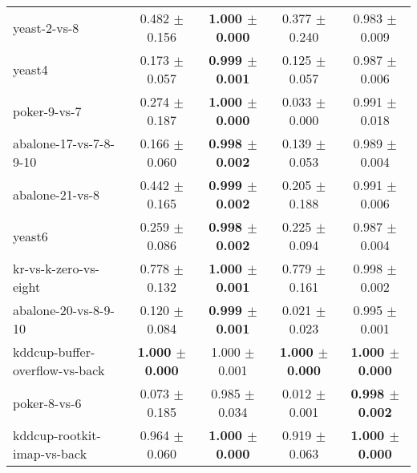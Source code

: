 \begin{table}[!ht]
{\begin{tabular}{l c c c c}
yeast-2-vs-8 & 0.482 $\pm$ 0.156 & \textbf{1.000 $\pm$ 0.000} & 0.377 $\pm$ 0.240 & 0.983 $\pm$ 0.009 \\
yeast4 & 0.173 $\pm$ 0.057 & \textbf{0.999 $\pm$ 0.001} & 0.125 $\pm$ 0.057 & 0.987 $\pm$ 0.006 \\
poker-9-vs-7 & 0.274 $\pm$ 0.187 & \textbf{1.000 $\pm$ 0.000} & 0.033 $\pm$ 0.000 & 0.991 $\pm$ 0.018 \\
abalone-17-vs-7-8-9-10 & 0.166 $\pm$ 0.060 & \textbf{0.998 $\pm$ 0.002} & 0.139 $\pm$ 0.053 & 0.989 $\pm$ 0.004 \\
abalone-21-vs-8 & 0.442 $\pm$ 0.165 & \textbf{0.999 $\pm$ 0.002} & 0.205 $\pm$ 0.188 & 0.991 $\pm$ 0.006 \\
yeast6 & 0.259 $\pm$ 0.086 & \textbf{0.998 $\pm$ 0.002} & 0.225 $\pm$ 0.094 & 0.987 $\pm$ 0.004 \\
kr-vs-k-zero-vs-eight & 0.778 $\pm$ 0.132 & \textbf{1.000 $\pm$ 0.001} & 0.779 $\pm$ 0.161 & 0.998 $\pm$ 0.002 \\
abalone-20-vs-8-9-10 & 0.120 $\pm$ 0.084 & \textbf{0.999 $\pm$ 0.001} & 0.021 $\pm$ 0.023 & 0.995 $\pm$ 0.001 \\
kddcup-buffer-overflow-vs-back & \textbf{1.000 $\pm$ 0.000} & 1.000 $\pm$ 0.001 & \textbf{1.000 $\pm$ 0.000} & \textbf{1.000 $\pm$ 0.000} \\
poker-8-vs-6 & 0.073 $\pm$ 0.185 & 0.985 $\pm$ 0.034 & 0.012 $\pm$ 0.001 & \textbf{0.998 $\pm$ 0.002} \\
kddcup-rootkit-imap-vs-back & 0.964 $\pm$ 0.060 & \textbf{1.000 $\pm$ 0.000} & 0.919 $\pm$ 0.063 & \textbf{1.000 $\pm$ 0.000} \\
\end{tabular}}
\end{table}
